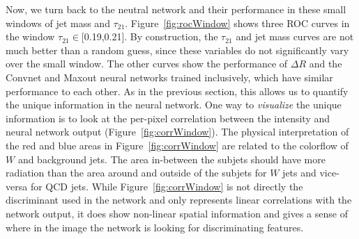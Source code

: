 
Now, we turn back to the neutral network and their performance in these small windows of jet mass and $\tau_{21}$.    Figure~\ref{fig:rocWindow} shows three ROC curves in the window $\tau_{21} \in$[0.19,0.21].  By construction, the $\tau_{21}$ and jet mass curves are not much better than a random guess, since these variables do not significantly vary over the small window.    The other curves show the performance of $\Delta R$ and the Convnet and Maxout neural networks trained inclusively, which have similar performance to each other.   As in the previous section, this allows us to quantify the unique information in the neural network.   One way to {\it visualize} the unique information is to look at the per-pixel correlation between the intensity and neural network output (Figure~\ref{fig:corrWindow}).  The physical interpretation of the red and blue areas in Figure~\ref{fig:corrWindow} are related to the colorflow of $W$ and background jets.  The area in-between the subjets should have more radiation than the area around and outside of the subjets for $W$ jets and vice-versa for QCD jets.  While Figure~\ref{fig:corrWindow} is not directly the discriminant used in the network and only represents linear correlations with the network output, it does show non-linear spatial information and gives a sense of where in the image the network is looking for discriminating features.



